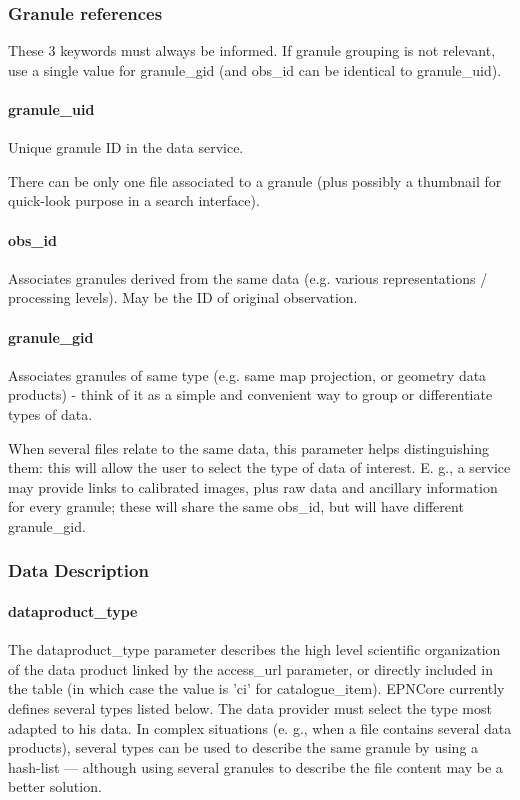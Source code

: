 \documentclass[11pt,a4paper]{ivoa}
\begin{document}
\subsubsection{Granule references}

These 3 keywords must always be informed. If granule grouping is not relevant, use a single value for granule\_gid (and obs\_id can be identical to granule\_uid).

\paragraph{granule\_uid}

Unique granule ID in the data service.

There can be only one file associated to a granule (plus possibly a thumbnail for quick-look purpose in a search interface).

\paragraph{obs\_id}

Associates granules derived from the same data (e.g. various representations / processing levels). May be the ID of original observation.

\paragraph{granule\_gid}

Associates granules of same type (e.g. same map projection, or geometry data products) - think of it as a simple and convenient way to group or differentiate types of data.

When several files relate to the same data, this parameter helps distinguishing them: this will allow the user to select the type of data of interest. E. g., a service may provide links to calibrated images, plus raw data and ancillary information for every granule; these will share the same obs\_id, but will have different granule\_gid.

\subsubsection{Data Description}

\paragraph{dataproduct\_type}

The dataproduct\_type parameter describes the high level scientific organization of the data product linked by the access\_url parameter, or directly included in the table (in which case the value is 'ci' for catalogue\_item). EPNCore currently defines several types listed below. The data provider must select the type most adapted to his data. In complex situations (e. g., when a file contains several data products), several types can be used to describe the same granule by using a hash-list — although using several granules to describe the file content may be a better solution.  
\end{document}

